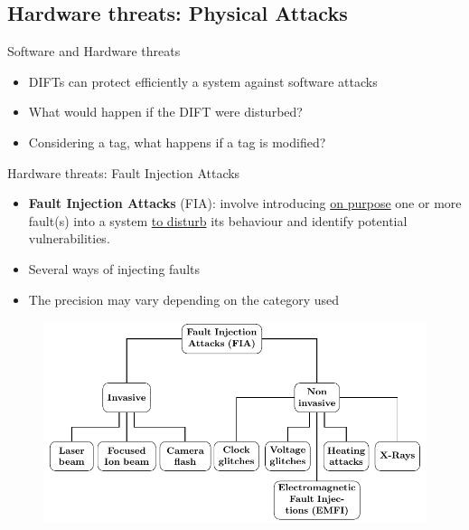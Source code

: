 \subsection{Hardware threats: Physical Attacks}
\begin{frame}{Software and Hardware threats}
    \begin{block}{}
        \begin{itemize}
            [square]
            \justifying
            \item DIFTs can protect efficiently a system against software attacks
            \item What would happen if the DIFT were disturbed?
            \item Considering a tag, what happens if a tag is modified?
        \end{itemize}
    \end{block}
\end{frame}

\begin{frame}{Hardware threats: Fault Injection Attacks}
    \begin{minipage}[c]{0.5\textwidth}
        \begin{block}{}
            \begin{itemize}
                [square]
                \justifying
                \item \textbf{Fault Injection Attacks} (FIA): involve introducing \underline{on purpose} one or more fault(s) into a system \underline{to disturb} its behaviour and identify potential vulnerabilities.
                \item Several ways of injecting faults
                \item The precision may vary depending on the category used
            \end{itemize}
        \end{block}
        \end{minipage}\hfill%
    \begin{minipage}[c]{0.5\textwidth}
        \begin{figure}
            \centering
            \includegraphics[height=.75\textheight, page=2]{src/1_introduction/img/physicalAttacks.pdf}
            \label{fig:fia}
        \end{figure}
    \end{minipage}
\end{frame}
